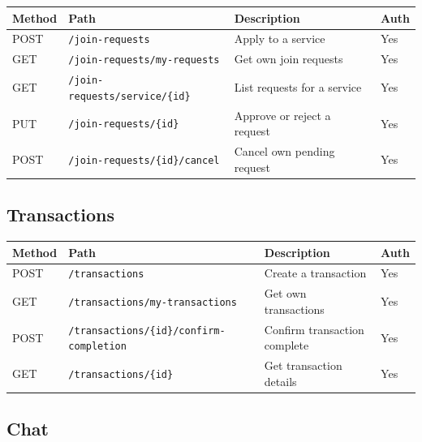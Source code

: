 \documentclass[10pt,a4paper]{report}
\begin{document}
\begin{longtable}{|l|p{4.5cm}|p{5cm}|l|}
    \hline
    \textbf{Method} & \textbf{Path}                               & \textbf{Description}            & \textbf{Auth} \\
    \hline
    \endhead
    POST            & \texttt{/join-requests}                     & Apply to a service              & Yes           \\
    \hline
    GET             & \texttt{/join-requests/my-requests}         & Get own join requests           & Yes           \\
    \hline
    GET             & \texttt{/join-requests/service/\{id\}}      & List requests for a service     & Yes           \\
    \hline
    PUT             & \texttt{/join-requests/\{id\}}              & Approve or reject a request     & Yes           \\
    \hline
    POST            & \texttt{/join-requests/\{id\}/cancel}       & Cancel own pending request      & Yes           \\
    \hline
\end{longtable}

\subsection{Transactions}

\begin{longtable}{|l|p{4.5cm}|p{5cm}|l|}
    \hline
    \textbf{Method} & \textbf{Path}                                     & \textbf{Description}              & \textbf{Auth} \\
    \hline
    \endhead
    POST            & \texttt{/transactions}                            & Create a transaction              & Yes           \\
    \hline
    GET             & \texttt{/transactions/my-transactions}            & Get own transactions              & Yes           \\
    \hline
    POST            & \texttt{/transactions/\{id\}/confirm-completion}  & Confirm transaction complete      & Yes           \\
    \hline
    GET             & \texttt{/transactions/\{id\}}                     & Get transaction details           & Yes           \\
    \hline
\end{longtable}

\subsection{Chat}
\end{document}
